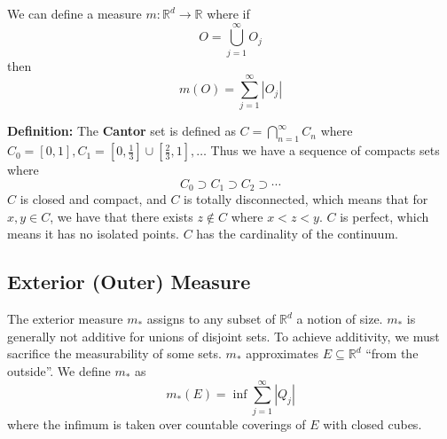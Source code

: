 \documentclass[12pt]{article}
\newcommand{\R}{\mathbb{R}}
\newcommand{\vertb}[1]{\left\vert#1\right\vert}
\begin{document}
We can define a measure \( m : \R^d \to \R \) where if
\[
	O = \bigcup_{j = 1}^\infty O_j
\]
then
\[
	m(O) = \sum_{j = 1}^\infty \vertb{O_j}
\]

\textbf{Definition:} The \textbf{Cantor} set is defined as
\( C = \bigcap_{n = 1}^\infty C_n \) where
\( C_0 = [0, 1], C_1 = [0, \frac{1}{3}] \cup [\frac{2}{3}, 1], \dots \)
Thus we have a sequence of compacts sets where
\[
	C_0 \supset C_1 \supset C_2 \supset \cdots
\]
\( C \) is closed and compact, and \( C \) is totally disconnected, which
means that for \( x, y \in C \), we have that there exists \( z \notin C \)
where \( x < z < y \).
\( C \) is perfect, which means it has no isolated points.
\( C \) has the cardinality of the continuum.

\subsection*{Exterior (Outer) Measure}

The exterior measure \( m_* \) assigns to any subset of \( \R^d \) a notion
of size.
\( m_* \) is generally not additive for unions of disjoint sets.
To achieve additivity, we must sacrifice the measurability of some sets.
\( m_* \) approximates \( E \subseteq \R^d \) ``from the outside''.
We define \( m_* \) as
\[
	m_*(E) = \inf \sum_{j = 1}^\infty \vertb{Q_j}
\]
where the infimum is taken over countable coverings of \( E \) with closed
cubes.
\end{document}
